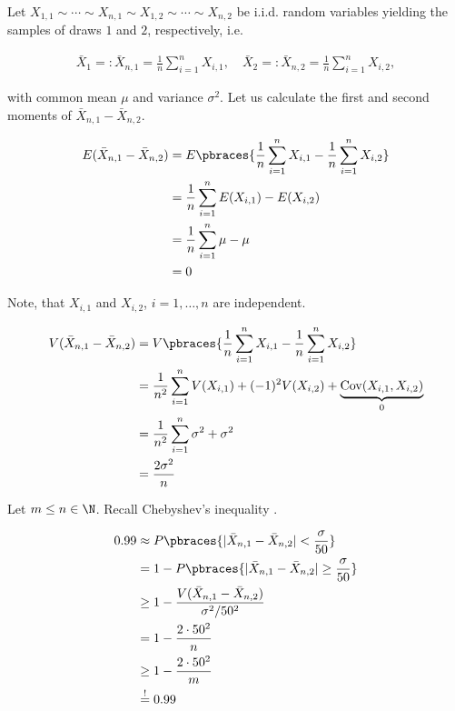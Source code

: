 \begin{solution}

Let $X_{1, 1} \sim \cdots \sim X_{n, 1} \sim X_{1, 2} \sim \cdots \sim X_{n, 2}$ be i.i.d. random variables yielding the samples of draws $1$ and $2$, respectively, i.e.

\begin{align*}
    \bar X_1 =: \bar X_{n, 1} = \frac{1}{n} \sum_{i=1}^n X_{i, 1},
    \quad
    \bar X_2 =: \bar X_{n, 2} = \frac{1}{n} \sum_{i=1}^n X_{i, 2},
\end{align*}

with common mean $\mu$ and variance $\sigma^2$.
Let us calculate the first and second moments of $\bar X_{n, 1} - \bar X_{n, 2}$.

\begin{align*}
    E(\bar X_{n, 1} - \bar X_{n, 2})
    & =
    E
    \pbraces
    {
        \frac{1}{n}
        \sum_{i=1}^n
            X_{i, 1}
            -
        \frac{1}{n}
        \sum_{i=1}^n
            X_{i, 2}
    } \\
    & =
    \frac{1}{n}
    \sum_{i=1}^n
        E(X_{i, 1}) - E(X_{i, 2}) \\
    & =
    \frac{1}{n}
    \sum_{i=1}^n
        \mu - \mu \\
    & =
    0
\end{align*}

Note, that $X_{i, 1}$ and $X_{i, 2}$, $i = 1, \dots, n$ are independent.

\begin{align*}
    V(\bar X_{n, 1} - \bar X_{n, 2})
    & =
    V
    \pbraces
    {
        \frac{1}{n}
        \sum_{i=1}^n
            X_{i, 1}
            -
        \frac{1}{n}
        \sum_{i=1}^n
            X_{i, 2}
    } \\
    & =
    \frac{1}{n^2}
    \sum_{i=1}^n
        V(X_{i, 1}) + (-1)^2 V(X_{i, 2}) + \underbrace{\operatorname{Cov}(X_{i, 1}, X_{i, 2})}_0 \\
    & =
    \frac{1}{n^2}
    \sum_{i=1}^n
        \sigma^2 + \sigma^2 \\
    & =
    \frac{2 \sigma^2}{n}
\end{align*}

Let $m \leq n \in \N$.
Recall Chebyshev's inequality \cite[Lecture 4, Slide 73]{EStat}.

\begin{align*}
    0.99
    & \approx
    P
    \pbraces
    {
        |\bar X_{n, 1} - \bar X_{n, 2}|
        <
        \frac{\sigma}{50}
    } \\
    & =
    1
    -
    P
    \pbraces
    {
        |\bar X_{n, 1} - \bar X_{n, 2}|
        \geq
        \frac{\sigma}{50}
    } \\
    & \geq
    1
    -
    \frac{V(\bar X_{n, 1} - \bar X_{n, 2})}{\sigma^2 / 50^2} \\
    & =
    1 - \frac{2 \cdot 50^2}{n} \\
    & \geq
    1 - \frac{2 \cdot 50^2}{m} \\
    & \stackrel{!}{=}
    0.99
\end{align*}


\end{solution}
